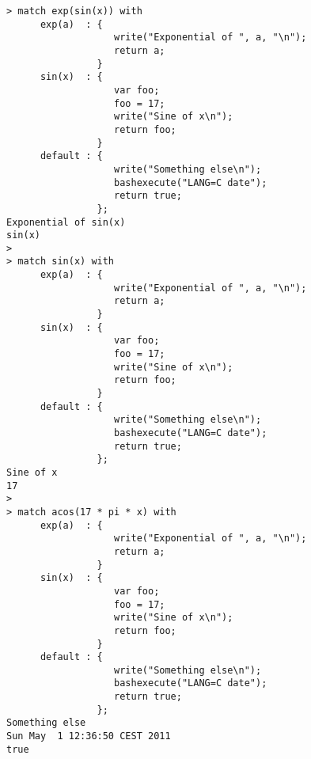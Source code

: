\begin{center}\begin{minipage}{15cm}\begin{Verbatim}[frame=single]
> match exp(sin(x)) with
      exp(a)  : { 
                   write("Exponential of ", a, "\n");
                   return a;
                }
      sin(x)  : {
                   var foo;
                   foo = 17;
                   write("Sine of x\n");
                   return foo;
                }
      default : {
                   write("Something else\n");
                   bashexecute("LANG=C date");
                   return true;
                };
Exponential of sin(x)
sin(x)
> 
> match sin(x) with
      exp(a)  : { 
                   write("Exponential of ", a, "\n");
                   return a;
                }
      sin(x)  : {
                   var foo;
                   foo = 17;
                   write("Sine of x\n");
                   return foo;
                }
      default : {
                   write("Something else\n");
                   bashexecute("LANG=C date");
                   return true;
                };
Sine of x
17
> 
> match acos(17 * pi * x) with
      exp(a)  : { 
                   write("Exponential of ", a, "\n");
                   return a;
                }
      sin(x)  : {
                   var foo;
                   foo = 17;
                   write("Sine of x\n");
                   return foo;
                }
      default : {
                   write("Something else\n");
                   bashexecute("LANG=C date");
                   return true;
                };
Something else
Sun May  1 12:36:50 CEST 2011
true
\end{Verbatim}
\end{minipage}\end{center}
